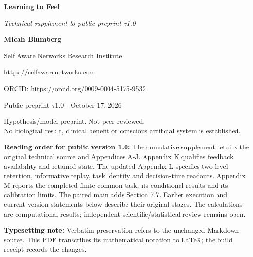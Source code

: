 \documentclass[
  american,
  11pt,
  letterpaper,
]{article}
\author{}
\date{}
\begin{document}
\begin{center}
{\LARGE\bfseries Learning to Feel\par}
\vspace{0.35em}
{\large\itshape Technical supplement to public preprint v1.0\par}
\vspace{0.8em}
{\small\textbf{Micah Blumberg}\par}
{\small Self Aware Networks Research Institute\par}
{\small\url{https://selfawarenetworks.com}\par}
{\small ORCID: \url{https://orcid.org/0009-0004-5175-9532}\par}
{\small Public preprint v1.0 - October 17, 2026\par}
\end{center}

\begin{center}\small
Hypothesis/model preprint. Not peer reviewed.\\
No biological result, clinical benefit or conscious artificial system is established.
\end{center}

\textbf{Reading order for public version 1.0:} The cumulative supplement retains the original technical source and Appendices A-J. Appendix K qualifies feedback availability and retained state. The updated Appendix L specifies two-level retention, informative replay, task identity and decision-time readouts. Appendix M reports the completed finite common task, its conditional results and its calibration limits. The paired main adds Section 7.7. Earlier execution and current-version statements below describe their original stages. The calculations are computational results; independent scientific/statistical review remains open.

\textbf{Typesetting note:} Verbatim preservation refers to the unchanged Markdown source. This PDF transcribes its mathematical notation to LaTeX; the build receipt records the changes.
\end{document}
